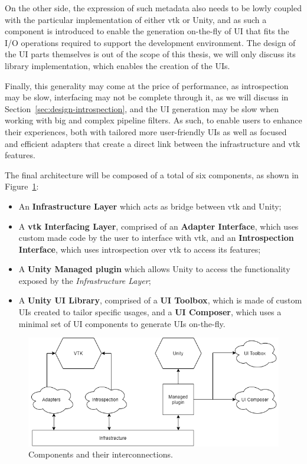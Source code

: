 On the other side, the expression of such metadata also needs to be lowly coupled with the particular implementation of either \acrshort{vtk} or Unity, and as such a component is introduced to enable the generation on-the-fly of UI that fits the I/O operations required to support the development environment. The design of the UI parts themselves is out of the scope of this thesis, we will only discuss its library implementation, which enables the creation of the UIs.

Finally, this generality may come at the price of performance, as introspection may be slow, interfacing may not be complete through it, as we will discuss in Section~\ref{sec:design-introspection}, and the UI generation may be slow when working with big and complex pipeline filters. As such, to enable users to enhance their experiences, both with tailored more user-friendly UIs as well as focused and efficient adapters that create a direct link between the infrastructure and \acrshort{vtk} features.

The final architecture will be composed of a total of six components, as shown in Figure~\ref{fig:high-level-architecture}:

\begin{itemize}
    \item An \textbf{Infrastructure Layer} which acts as bridge between \acrshort{vtk} and Unity;
    \item A \textbf{\acrshort{vtk} Interfacing Layer}, comprised of an \textbf{Adapter Interface}, which uses custom made code by the user to interface with \acrshort{vtk}, and an \textbf{Introspection Interface}, which uses introspection over \acrshort{vtk} to access its features;
    \item A \textbf{Unity Managed plugin} which allows Unity to access the functionality exposed by the \textit{Infrastructure Layer};
    \item A \textbf{Unity UI Library}, comprised of a \textbf{UI Toolbox}, which is made of custom UIs created to tailor specific usages, and a \textbf{UI Composer}, which uses a minimal set of UI components to generate UIs on-the-fly.
\end{itemize}

\begin{figure}
    \centering
    \includegraphics[width=\textwidth]{pictures/Architecture-high-level-transparent.png}
    \caption{Components and their interconnections.}
    \label{fig:high-level-architecture}
\end{figure}

